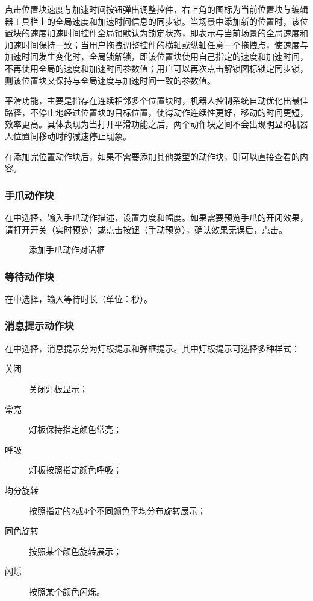 点击位置块速度与加速时间按钮弹出调整控件，右上角的图标为当前位置块与编辑器工具栏上的全局速度和加速时间信息的同步锁。当场景中添加新的位置时，该位置块的速度加速时间控件全局锁默认为锁定状态，即表示与当前场景的全局速度和加速时间保持一致；当用户拖拽调整控件的横轴或纵轴任意一个拖拽点，使速度与加速时间发生变化时，全局锁解锁，即该位置块使用自己指定的速度和加速时间，不再使用全局的速度和加速时间参数值；用户可以再次点击解锁图标锁定同步锁，则该位置块又保持与全局速度与加速时间一致的参数值。

平滑功能，主要是指存在连续相邻多个位置块时，机器人控制系统自动优化出最佳路径，不停止地经过位置块的目标位置，使得动作连续性更好，移动的时间更短，效率更高。具体表现为当打开平滑功能之后，两个动作块之间不会出现明显的机器人位置间移动时的减速停止现象。

在添加完位置动作块后，如果不需要添加其他类型的动作块，则可以直接查看的内容。

\subsubsection{手爪动作块}
在中选择，输入手爪动作描述，设置力度和幅度。如果需要预览手爪的开闭效果，请打开开关（实时预览）或点击按钮（手动预览），确认效果无误后，点击。

\begin{figure}[ht]
	\centering
	\color{red}{缺图}
	\caption{添加手爪动作对话框}
	\label{fig:添加手爪动作对话框}
\end{figure}

\subsubsection{等待动作块}
在中选择，输入等待时长（单位：秒）。
\subsubsection{消息提示动作块}
在中选择，消息提示分为灯板提示和弹框提示。其中灯板提示可选择多种样式：
\begin{description}
\item[关闭] 关闭灯板显示；
\item[常亮] 灯板保持指定颜色常亮；
\item[呼吸] 灯板按照指定颜色呼吸；
\item[均分旋转] 按照指定的2或4个不同颜色平均分布旋转展示；
\item[同色旋转] 按照某个颜色旋转展示；
\item[闪烁] 按照某个颜色闪烁。
\end{description}
